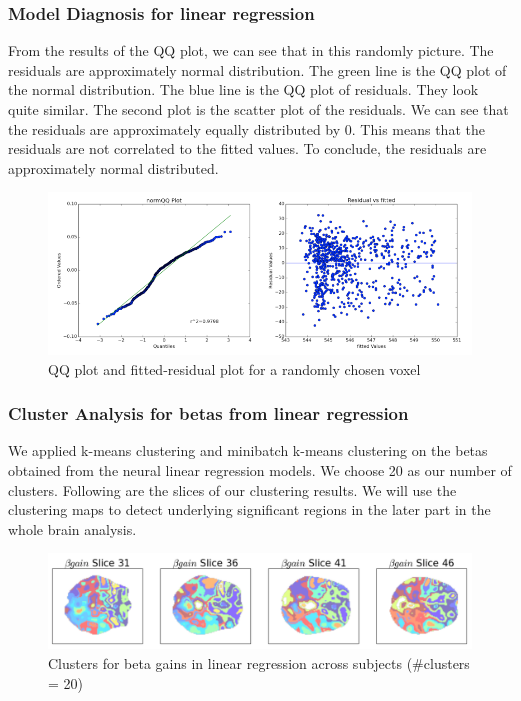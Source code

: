 \documentclass[11pt]{article}
\begin{document}
\subsubsection{Model Diagnosis for linear regression}

From the results of the QQ plot, we can see that in this randomly picture. The residuals are approximately normal distribution. The green line is the QQ plot of the normal distribution. The blue line is the QQ plot of residuals. They look quite similar. The second plot is the scatter plot of the residuals. We can see that the residuals are approximately equally distributed by 0. This means that the residuals are not correlated to the fitted values. To conclude, the residuals are approximately normal distributed.

\begin{figure}[H]
    \centering
        \includegraphics[scale=0.4]{figures/Regression2/diagnosis.png}
    \caption{QQ plot and fitted-residual plot for a randomly chosen voxel}
\end{figure}

\subsubsection{Cluster Analysis for betas from linear regression}

We applied k-means clustering and minibatch k-means clustering on the betas obtained from the neural linear regression models. We choose 20 as our number of clusters. Following are the slices of our clustering results. We will use the clustering maps to detect underlying significant regions in the later part in the whole brain analysis.

\begin{figure}[H]
    \centering
        \includegraphics[scale=0.4]{figures/Regression2/beta_gain_cluster.png}
    \caption{Clusters for beta gains in linear regression across subjects (\#clusters = 20)}
\end{figure}
\end{document}
